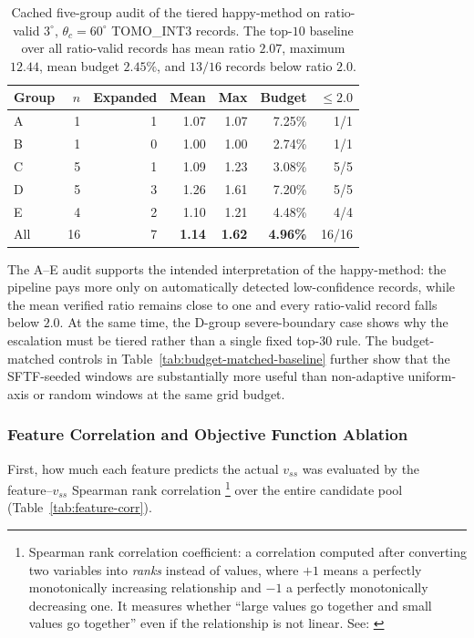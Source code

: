 \documentclass[11pt,a4paper]{article}
\begin{document}
\begin{table}[H]
\centering
\caption{Cached five-group audit of the tiered happy-method on ratio-valid $3^\circ$, $\theta_c=60^\circ$ TOMO\_INT3 records.
The top-$10$ baseline over all ratio-valid records has mean ratio $2.07$, maximum $12.44$, mean budget $2.45\%$, and $13/16$ records below ratio $2.0$.}
\label{tab:happy-method-g5}
\small
\begin{tabular}{lrrrrrr}
\toprule
Group & $n$ & Expanded & Mean & Max & Budget & $\le 2.0$\\
\midrule
A & 1 & 1 & 1.07 & 1.07 & 7.25\% & 1/1\\
B & 1 & 0 & 1.00 & 1.00 & 2.74\% & 1/1\\
C & 5 & 1 & 1.09 & 1.23 & 3.08\% & 5/5\\
D & 5 & 3 & 1.26 & 1.61 & 7.20\% & 5/5\\
E & 4 & 2 & 1.10 & 1.21 & 4.48\% & 4/4\\
\midrule
All & 16 & 7 & \textbf{1.14} & \textbf{1.62} & \textbf{4.96\%} & 16/16\\
\bottomrule
\end{tabular}
\end{table}

The A--E audit supports the intended interpretation of the happy-method:
the pipeline pays more only on automatically detected low-confidence records,
while the mean verified ratio remains close to one and every ratio-valid record falls below $2.0$.
At the same time, the D-group severe-boundary case shows why the escalation must be tiered rather than a single fixed top-$30$ rule.
The budget-matched controls in Table~\ref{tab:budget-matched-baseline} further show that the SFTF-seeded windows
are substantially more useful than non-adaptive uniform-axis or random windows at the same grid budget.

\subsubsection{Feature Correlation and Objective Function Ablation}
\label{sec:ablation}

First, how much each feature predicts the actual $v_{ss}$ was evaluated by the
feature--$v_{ss}$ Spearman rank correlation%
\footnote{Spearman rank correlation coefficient: a correlation computed after converting two variables into \emph{ranks} instead of values,
where $+1$ means a perfectly monotonically increasing relationship and $-1$ a perfectly monotonically decreasing one. It measures whether
``large values go together and small values go together'' even if the relationship is not linear. See: \cite{spearman1904}}
over the entire candidate pool (Table~\ref{tab:feature-corr}).
\end{document}
